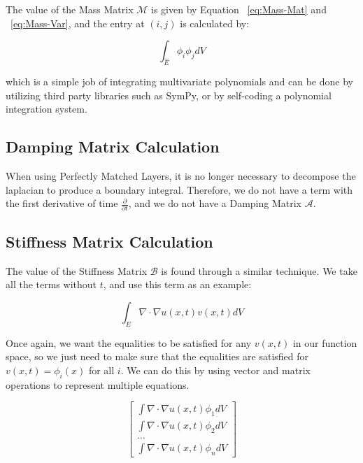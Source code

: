The value of the Mass Matrix $\mathcal{M}$ is given by Equation ~\ref{eq:Mass-Mat} and ~\ref{eq:Mass-Var}, and the entry at $(i,j)$ is calculated by:

\begin{equation}
\label{eq:Mass-Eq}
\int_{\hat{E}} \phi_i \phi_j dV
\end{equation}

which is a simple job of integrating multivariate polynomials and can be done by utilizing third party libraries such as SymPy, or by self-coding a polynomial integration system.
 
\subsection{Damping Matrix Calculation}

When using Perfectly Matched Layers, it is no longer necessary to decompose the laplacian to produce a boundary integral. Therefore, we do not have a term with the first derivative of time $\frac{\partial}{\partial t}$, and we do not have a Damping Matrix $\mathcal{A}$.

\subsection{Stiffness Matrix Calculation}

The value of the Stiffness Matrix $\mathcal{B}$ is found through a similar technique. We take all the terms without $t$, and use this term as an example:

\begin{equation}
\int_E \nabla \cdot \nabla u(x,t) v(x,t) dV
\end{equation}

Once again, we want the equalities to be satisfied for any $v(x,t)$ in our function space, so we just need to make sure that the equalities are satisfied for $v(x,t) = \phi_i(x)$ for all $i$. We can do this by using vector and matrix operations to represent multiple equations.

\begin{equation}
\begin{bmatrix}
\int \nabla \cdot \nabla u(x,t) \phi_1 dV \\
\int \nabla \cdot \nabla u(x,t) \phi_2 dV \\
\ldots \\
\int \nabla \cdot \nabla u(x,t) \phi_n dV
\end{bmatrix}
\end{equation}


